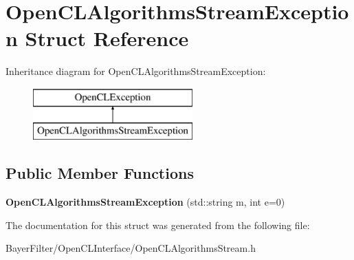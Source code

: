 \hypertarget{struct_open_c_l_algorithms_stream_exception}{\section{Open\-C\-L\-Algorithms\-Stream\-Exception Struct Reference}
\label{struct_open_c_l_algorithms_stream_exception}
}
Inheritance diagram for Open\-C\-L\-Algorithms\-Stream\-Exception\-:\begin{figure}[H]
\begin{center}
\leavevmode
\includegraphics[height=2.000000cm]{struct_open_c_l_algorithms_stream_exception}
\end{center}
\end{figure}
\subsection*{Public Member Functions}
\begin{DoxyCompactItemize}
\item 
\hypertarget{struct_open_c_l_algorithms_stream_exception_a981a528ab8b9b96e9c642e08a456a277}{{\bfseries Open\-C\-L\-Algorithms\-Stream\-Exception} (std\-::string m, int e=0)}\label{struct_open_c_l_algorithms_stream_exception_a981a528ab8b9b96e9c642e08a456a277}

\end{DoxyCompactItemize}


The documentation for this struct was generated from the following file\-:\begin{DoxyCompactItemize}
\item 
Bayer\-Filter/\-Open\-C\-L\-Interface/Open\-C\-L\-Algorithms\-Stream.\-h\end{DoxyCompactItemize}
